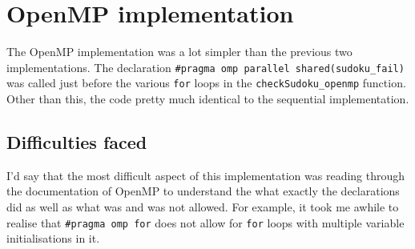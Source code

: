 \documentclass[parallelismlabreport.tex]{subfiles}
\begin{document}
\section{OpenMP implementation}
The OpenMP implementation was a lot simpler than the previous two implementations. The declaration \verb|#pragma omp parallel shared(sudoku_fail)| was called just before the various \verb|for| loops in the \verb|checkSudoku_openmp| function. Other than this, the code pretty much identical to the sequential implementation.
\subsection{Difficulties faced}
I'd say that the most difficult aspect of this implementation was reading through the documentation of OpenMP to understand the what exactly the declarations did as well as what was and was not allowed. For example, it took me awhile to realise that \verb|#pragma omp for| does not allow for \verb|for| loops with multiple variable initialisations in it.
\end{document}
